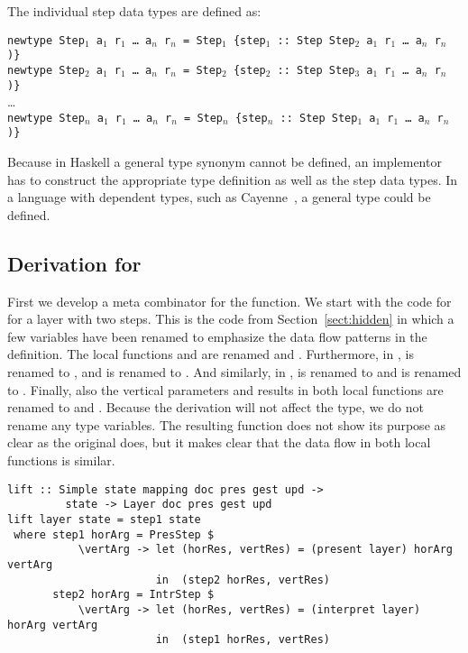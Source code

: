 \documentclass[preprint,natbib]{sigplanconf}
\begin{document}
The individual step data types are defined as:

\begin{small}
{\tt newtype Step$_1$ a$_1$ r$_1$ \dots ~a$_n$ r$_n$ = Step$_1$ \{step$_1$}\verb| :: |{\tt Step Step$_2$ a$_1$ r$_1$ \dots ~a$_n$ r$_n$ )\}}\\
{\tt newtype Step$_2$ a$_1$ r$_1$ \dots ~a$_n$ r$_n$ = Step$_2$ \{step$_2$}\verb| :: |{\tt Step Step$_3$ a$_1$ r$_1$ \dots ~a$_n$ r$_n$ )\}}\\
\dots\\
{\tt newtype Step$_n$ a$_1$ r$_1$ \dots ~a$_n$ r$_n$ = Step$_n$ \{step$_n$}\verb| :: |{\tt Step Step$_1$ a$_1$ r$_1$ \dots ~a$_n$ r$_n$ )\}}
\end{small}

Because in Haskell a general  type synonym cannot be defined, an implementor has to construct the appropriate  type definition as well as the step data types. In a language with dependent types, such as Cayenne~\cite{augustsson98cayenne}, a general type  could be defined.


%																
\subsection{Derivation for }

First we develop a meta combinator for the  function. We start with the code for  for a layer with two steps. This is the code from Section~\ref{sect:hidden} in which a few variables have been renamed to emphasize the data flow patterns in the definition.
\bc The local functions  and  are renamed  and . Furthermore, in ,  is renamed to , and  is renamed to . And similarly, in ,  is renamed to  and  is renamed to . Finally, also the vertical parameters and results in both local functions are renamed to  and . Because the derivation will not affect the type, we do not rename any type variables. The resulting function does not show its purpose as clear as the original does, but it makes clear that the data flow in both local functions is similar. \ec


\begin{small} %
\begin{verbatim}
lift :: Simple state mapping doc pres gest upd ->
         state -> Layer doc pres gest upd
lift layer state = step1 state 
 where step1 horArg = PresStep $ 
           \vertArg -> let (horRes, vertRes) = (present layer) horArg vertArg                                         
                       in  (step2 horRes, vertRes)
       step2 horArg = IntrStep $
           \vertArg -> let (horRes, vertRes) = (interpret layer) horArg vertArg                     
                       in  (step1 horRes, vertRes)
\end{verbatim}
\end{small}
\end{document}
